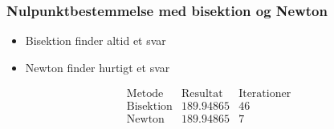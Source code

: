 \begin{frame}
\frametitle{Nulpunktbestemmelse med \phantom{Heeekjjjjeej} bisektion og Newton}
\begin{itemize}
\item Bisektion finder altid et svar
\item Newton finder hurtigt et svar
\end{itemize}

$$\begin{array}{l|c|c}
\text{Metode} & \text{Resultat} & \text{Iterationer}\\
\hline
\text{Bisektion}	& 189.94865 & 46\\
\text{Newton}		& 189.94865 & 7\\
\end{array}$$

\end{frame}
